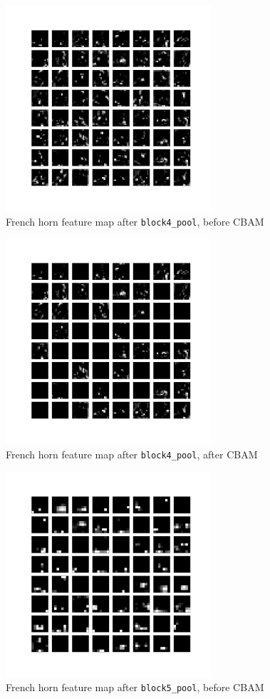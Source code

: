 \documentclass{article}
\begin{document}
\begin{appendices}
\begin{figure}[H]
    \centering
    \includegraphics[width=3in]{csci-8920/hw-4/images/horn-pre-CBAM-14-block4_pool.png}
    \caption{French horn feature map after \lstinline{block4_pool}, before CBAM}
    \label{fig:horn_4_post}
\end{figure}
\begin{figure}[H]
    \centering
    \includegraphics[width=3in]{csci-8920/hw-4/images/horn-post-CBAM-14-block4_pool.png}
    \caption{French horn feature map after \lstinline{block4_pool}, after CBAM}
    \label{fig:horn_5_pre}
\end{figure}

\begin{figure}[H]
    \centering
    \includegraphics[width=3in]{csci-8920/hw-4/images/horn-pre-CBAM-18-block5_pool.png}
    \caption{French horn feature map after \lstinline{block5_pool}, before CBAM}
    \label{fig:horn_5_pre}
\end{figure}


\end{appendices}
\end{document}
